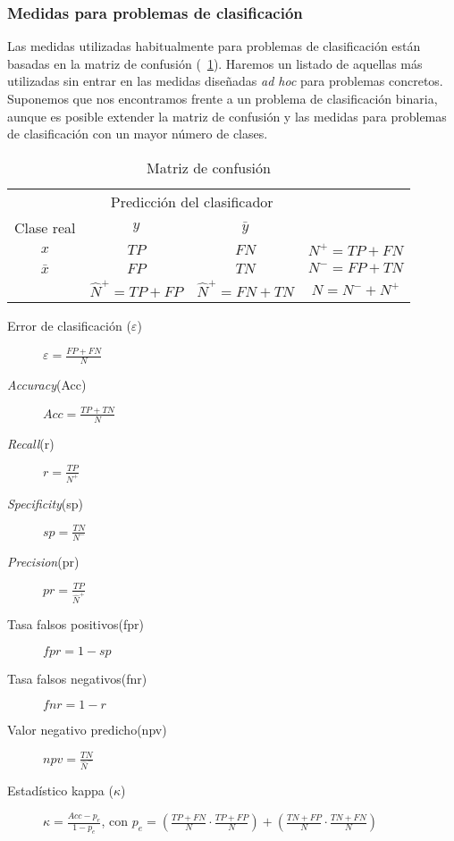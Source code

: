 \subsubsection*{Medidas para problemas de clasificación}

	Las medidas utilizadas habitualmente para problemas de clasificación están basadas en la matriz de confusión (~\ref{tab:matrizconfusion}). Haremos un listado de aquellas más utilizadas sin entrar en las medidas diseñadas \textit{ad hoc} para problemas concretos. Suponemos que nos encontramos frente a un problema de clasificación binaria, aunque es posible extender la matriz de confusión y las medidas para problemas de clasificación con un mayor número de clases.

\begin{table}[H]
\centering
\begin{tabular}{cccc}
\cline{1-3}
\multicolumn{1}{|c|}{}           & \multicolumn{2}{c|}{Predicción del clasificador}      &                 \\ \cline{1-3}
\multicolumn{1}{|c|}{Clase real} & \multicolumn{1}{c|}{$y$}    & \multicolumn{1}{c|}{$\bar{y}$}    &                 \\ \cline{1-3}
\multicolumn{1}{|c|}{$x$}          & \multicolumn{1}{c|}{$TP$} & \multicolumn{1}{c|}{$FN$} & $N^+ = TP + FN$ \\ \cline{1-3}
\multicolumn{1}{|c|}{$\bar{x}$}          & \multicolumn{1}{c|}{$FP$} & \multicolumn{1}{c|}{$TN$} & $N^- = FP + TN$ \\ \cline{1-3}
                                & $\hat{N}^+ = TP + FP$     & $\hat{N}^+ = FN + TN$     &   $N = N^- + N^+$             
\end{tabular}
\caption{Matriz de confusión}
\label{tab:matrizconfusion}
\end{table} 
	
\begin{description}
	\item[Error de clasificación ($\varepsilon$)] $\varepsilon = \frac{FP+FN}{N}$
	\item[\textit{Accuracy}(Acc)] $Acc=\frac{TP+TN}{N}$
	\item[\textit{Recall}(r)] $r=\frac{TP}{N^+}$
	\item[\textit{Specificity}(sp)] $sp=\frac{TN}{N^-}$
	\item[\textit{Precision}(pr)] $pr=\frac{TP}{\hat{N}^+}$
	\item[Tasa falsos positivos(fpr)] $fpr=1-sp$
	\item[Tasa falsos negativos(fnr)] $fnr=1-r$
	\item[Valor negativo predicho(npv)] $npv=\frac{TN}{\hat{N}^-}$
	\item[Estadístico kappa ($\kappa$)] $\kappa = \frac{Acc-p_e}{1-p_e}$, con $p_e = \left( \frac{TP+FN}{N} \cdot \frac{TP+FP}{N} \right) + \left( \frac{TN+FP}{N} \cdot \frac{TN+FN}{N} \right)$ 
\end{description}
	
